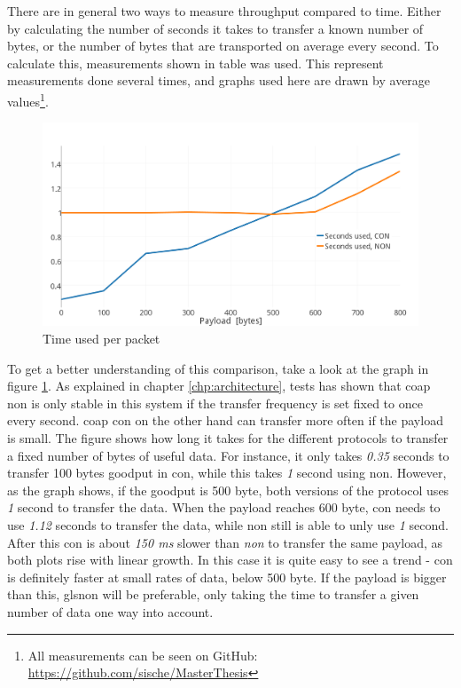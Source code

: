 There are in general two ways to measure throughput compared to time. Either by calculating the number of seconds it takes to transfer a known number of bytes, or the number of bytes that are transported on average every second. To calculate this, measurements shown in table  was used. This represent measurements done several times, and graphs used here are drawn by average values\footnote{All measurements can be seen on GitHub: \url{https://github.com/sische/MasterThesis}}. 

\begin{figure}[ht]
    \centering
    \includegraphics[scale=1.0]{timeUsedPRpacket2.png}    
    \caption{Time used per packet}
    \label{fig:timeUsedPRpacket}
\end{figure}

To get a better understanding of this comparison, take a look at the graph in figure \ref{fig:timeUsedPRpacket}. As explained in chapter \ref{chp:architecture}, tests has shown that \gls{coap} \gls{non} is only stable in this system if the transfer frequency is set fixed to once every second. \gls{coap} \gls{con} on the other hand can transfer more often if the \gls{payload} is small. The figure shows how long it takes for the different protocols to transfer a fixed number of bytes of useful data. For instance, it only takes \textit{0.35} seconds to transfer 100 bytes goodput in \gls{con}, while this takes \textit{1} second using \gls{non}. However, as the graph shows, if the goodput is 500 byte, both versions of the protocol uses \textit{1} second to transfer the data. When the \gls{payload} reaches 600 byte, \gls{con} needs to use \textit{1.12} seconds to transfer the data, while \gls{non} still is able to unly use \textit{1} second. After this \gls{con} is about \textit{150 ms} slower than \textit{non} to transfer the same payload, as both plots rise with linear growth. In this case it is quite easy to see a trend - \gls{con} is definitely faster at small rates of data, below 500 byte. If the payload is bigger than this, gls{non} will be preferable, only taking the time to transfer a given number of data one way into account. 

